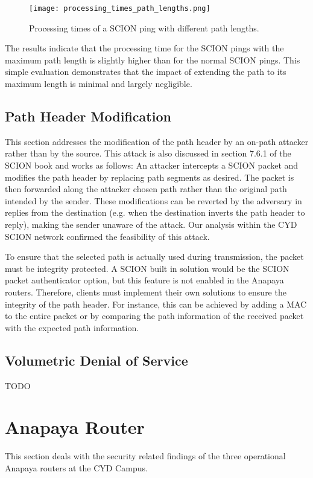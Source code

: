 \begin{figure}[h]
    \centering
    \texttt{[image: processing\_times\_path\_lengths.png]}
    \caption{Processing times of a SCION ping with different path lengths.}
    \label{fig:path_extension}
\end{figure}

The results indicate that the processing time for the SCION pings with the maximum path length is slightly higher than for the normal SCION pings.
This simple evaluation demonstrates that the impact of extending the path to its maximum length is minimal and largely negligible.


\subsection{Path Header Modification}
This section addresses the modification of the path header by an on-path attacker rather than by the source.
This attack is also discussed in section 7.6.1 of the SCION book \cite{Perrig2022} and works as follows:
An attacker intercepts a SCION packet and modifies the path header by replacing path segments as desired.
The packet is then forwarded along the attacker chosen path rather than the original path intended by the sender.
These modifications can be reverted by the adversary in replies from the destination (e.g. when the destination inverts the path header to reply), making the sender unaware of the attack.
Our analysis within the CYD SCION network confirmed the feasibility of this attack.

To ensure that the selected path is actually used during transmission, the packet must be integrity protected.
A SCION built in solution would be the SCION packet authenticator option, but this feature is not enabled in the Anapaya routers.
Therefore, clients must implement their own solutions to ensure the integrity of the path header.
For instance, this can be achieved by adding a MAC to the entire packet or by comparing the path information of the received packet with the expected path information.


\subsection{Volumetric Denial of Service}
TODO







\section{Anapaya Router}
This section deals with the security related findings of the three operational Anapaya routers at the CYD Campus.


